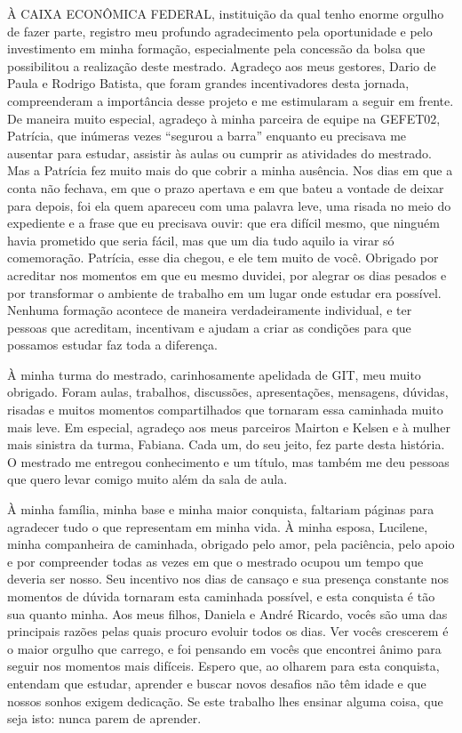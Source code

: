 \begin{agradecimentos}
À CAIXA ECONÔMICA FEDERAL, instituição da qual tenho enorme orgulho de fazer
parte, registro meu profundo agradecimento pela oportunidade e pelo investimento
em minha formação, especialmente pela concessão da bolsa que possibilitou a
realização deste mestrado. Agradeço aos meus gestores, Dario de Paula e Rodrigo
Batista, que foram grandes incentivadores desta jornada, compreenderam a
importância desse projeto e me estimularam a seguir em frente. De maneira muito
especial, agradeço à minha parceira de equipe na GEFET02, Patrícia, que
inúmeras vezes ``segurou a barra'' enquanto eu precisava me ausentar para
estudar, assistir às aulas ou cumprir as atividades do mestrado. Mas a Patrícia
fez muito mais do que cobrir a minha ausência. Nos dias em que a conta não
fechava, em que o prazo apertava e em que bateu a vontade de deixar para depois,
foi ela quem apareceu com uma palavra leve, uma risada no meio do expediente e a
frase que eu precisava ouvir: que era difícil mesmo, que ninguém havia prometido
que seria fácil, mas que um dia tudo aquilo ia virar só comemoração. Patrícia,
esse dia chegou, e ele tem muito de você. Obrigado por acreditar nos momentos em
que eu mesmo duvidei, por alegrar os dias pesados e por transformar o ambiente
de trabalho em um lugar onde estudar era possível. Nenhuma formação acontece de
maneira verdadeiramente individual, e ter pessoas que acreditam, incentivam e
ajudam a criar as condições para que possamos estudar faz toda a diferença.

À minha turma do mestrado, carinhosamente apelidada de GIT, meu muito obrigado.
Foram aulas, trabalhos, discussões, apresentações, mensagens, dúvidas, risadas e
muitos momentos compartilhados que tornaram essa caminhada muito mais leve. Em
especial, agradeço aos meus parceiros Mairton e Kelsen e à mulher mais sinistra
da turma, Fabiana. Cada um, do seu jeito, fez parte desta história. O mestrado
me entregou conhecimento e um título, mas também me deu pessoas que quero levar
comigo muito além da sala de aula.

À minha família, minha base e minha maior conquista, faltariam páginas para
agradecer tudo o que representam em minha vida. À minha esposa, Lucilene, minha
companheira de caminhada, obrigado pelo amor, pela paciência, pelo apoio e por
compreender todas as vezes em que o mestrado ocupou um tempo que deveria ser
nosso. Seu incentivo nos dias de cansaço e sua presença constante nos momentos
de dúvida tornaram esta caminhada possível, e esta conquista é tão sua quanto
minha. Aos meus filhos, Daniela e André Ricardo, vocês são uma das principais
razões pelas quais procuro evoluir todos os dias. Ver vocês crescerem é o maior
orgulho que carrego, e foi pensando em vocês que encontrei ânimo para seguir nos
momentos mais difíceis. Espero que, ao olharem para esta conquista, entendam que
estudar, aprender e buscar novos desafios não têm idade e que nossos sonhos
exigem dedicação. Se este trabalho lhes ensinar alguma coisa, que seja isto:
nunca parem de aprender.


\end{agradecimentos}
